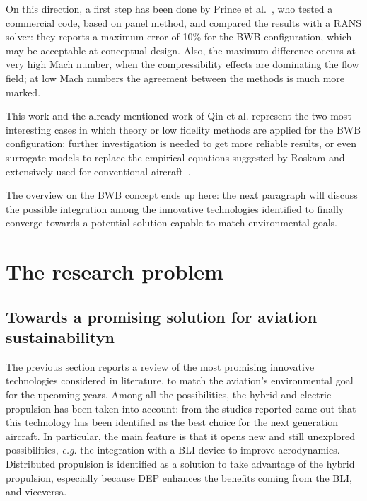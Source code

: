 On this direction, a first step has been done by Prince et al.~\cite{bib:prince}, who tested a commercial code, based on panel method, and compared the results with a RANS solver: they reports a maximum error of 10\% for the BWB configuration, which may be acceptable at conceptual design. 
Also, the maximum difference occurs at very high Mach number, when the compressibility effects are dominating the flow field; at low Mach numbers the agreement between the methods is much more marked. 

This work and the already mentioned work of Qin et al. represent the two most interesting cases in which theory or low fidelity methods are applied for the BWB configuration; further investigation is needed to get more reliable results, or even surrogate models to replace the empirical equations suggested by Roskam and extensively used for conventional aircraft~\cite{bib:roskam_partVI}.

The overview on the BWB concept ends up here: the next paragraph will discuss the possible integration among the innovative technologies identified to finally converge towards a potential solution capable to match environmental goals. 

\section{The research problem} 
\label{sec:chap1_research_problem}

\subsection{Towards a promising solution for aviation sustainabilityn}
\label{subsec:chap1_conf_proposition}

The previous section reports a review of the most promising innovative technologies considered in literature, to match the aviation's environmental goal for the upcoming years. 
Among all the possibilities, the hybrid and electric propulsion has been taken into account: from the studies reported came out that this technology has been identified as the best choice for the next generation aircraft. 
In particular, the main feature is that it opens new and still unexplored possibilities, \textit{e.g.} the integration with a BLI device to improve aerodynamics. 
Distributed propulsion is identified as a solution to take advantage of the hybrid propulsion, especially because DEP enhances the benefits coming from the BLI, and viceversa. 

